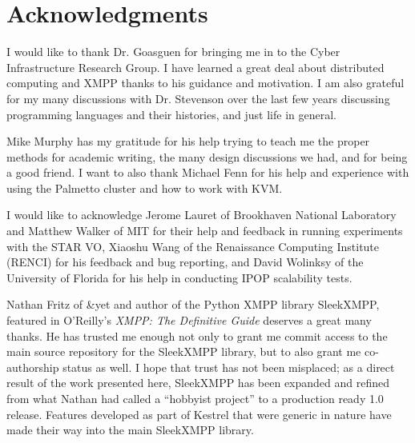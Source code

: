 \chapter*{Acknowledgments}

I would like to thank Dr. Goasguen for bringing me in to the Cyber Infrastructure
Research Group. I have learned a great deal about distributed computing and XMPP
thanks to his guidance and motivation. I am also grateful for my many discussions
with Dr. Stevenson over the last few years discussing programming languages and
their histories, and just life in general.

Mike Murphy has my gratitude for his help trying to teach me the proper methods
for academic writing, the many design discussions we had, and for being a good
friend. I want to also thank Michael Fenn for his help and experience with using
the Palmetto cluster and how to work with KVM.

I would like to acknowledge Jerome Lauret of Brookhaven National Laboratory and
Matthew Walker of MIT for their help and feedback in running experiments with
the STAR VO, Xiaoshu Wang of the Renaissance Computing Institute (RENCI) for his
feedback and bug reporting, and David Wolinksy of the University of Florida for
his help in conducting IPOP scalability tests.

Nathan Fritz of \&yet and author of the Python XMPP library SleekXMPP, featured
in O'Reilly's \textit{XMPP: The Definitive Guide} deserves a great many thanks.
He has trusted me enough not only to grant me commit access to the main source
repository for the SleekXMPP library, but to also grant me co-authorship status as
well. I hope that trust has not been misplaced; as a direct result of the work
presented here, SleekXMPP has been expanded and refined from what Nathan had
called a ``hobbyist project'' to a production ready 1.0 release. Features developed
as part of Kestrel that were generic in nature have made their way into the main
SleekXMPP library.
